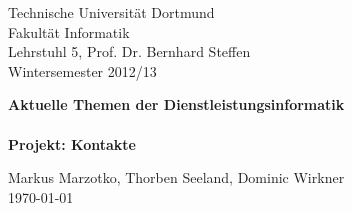 \begin{titlepage}
\begin{small}
\vfill {Technische Universit\"at Dortmund\\ 
Fakult\"at Informatik \\
Lehrstuhl 5, Prof. Dr. Bernhard Steffen \\
Wintersemester 2012/13}
\end{small}


\begin{center}
\begin{Large}
\vfill {\textsf{\textbf{
Aktuelle Themen der Dienstleistungsinformatik\\\ \\
Projekt: Kontakte
}}}
\end{Large}
\end{center}

\begin{small}
\vfill Markus Marzotko, Thorben Seeland, Dominic Wirkner\\ 
\today
\end{small}

\end{titlepage}
